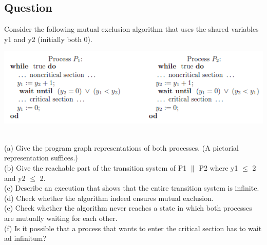 \documentclass[12pt]{article}
\begin{document}
\subsection*{Question}
Consider the following mutual exclusion algorithm that uses the shared variables
y1 and y2 (initially both 0).\\
\begin{centering}
	\includegraphics*[scale=1]{ex29.png}
\end{centering}
\\
(a) Give the program graph representations of both processes. (A pictorial representation suffices.)\\
(b) Give the reachable part of the transition system of P1 $\|$ P2 where y1 $\leq$ 2 and y2 $\leq$ 2.\\
(c) Describe an execution that shows that the entire transition system is infinite.\\
(d) Check whether the algorithm indeed ensures mutual exclusion.\\
(e) Check whether the algorithm never reaches a state in which both processes are mutually
waiting for each other.\\
(f) Is it possible that a process that wants to enter the critical section has to wait ad infinitum?\\
\end{document}
